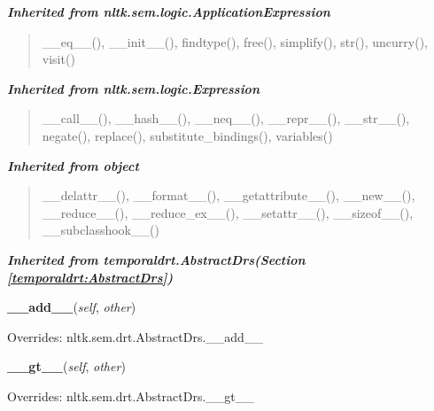 \large{\textbf{\textit{Inherited from nltk.sem.logic.ApplicationExpression}}}

\begin{quote}
\_\_eq\_\_(), \_\_init\_\_(), findtype(), free(), simplify(), str(), uncurry(), visit()
\end{quote}

\large{\textbf{\textit{Inherited from nltk.sem.logic.Expression}}}

\begin{quote}
\_\_call\_\_(), \_\_hash\_\_(), \_\_neq\_\_(), \_\_repr\_\_(), \_\_str\_\_(), negate(), replace(), substitute\_bindings(), variables()
\end{quote}

\large{\textbf{\textit{Inherited from object}}}

\begin{quote}
\_\_delattr\_\_(), \_\_format\_\_(), \_\_getattribute\_\_(), \_\_new\_\_(), \_\_reduce\_\_(), \_\_reduce\_ex\_\_(), \_\_setattr\_\_(), \_\_sizeof\_\_(), \_\_subclasshook\_\_()
\end{quote}

\large{\textbf{\textit{Inherited from temporaldrt.AbstractDrs\textit{(Section \ref{temporaldrt:AbstractDrs})}}}}

    \vspace{0.5ex}

\hspace{.8\funcindent}\begin{boxedminipage}{\funcwidth}

    \raggedright \textbf{\_\_add\_\_}(\textit{self}, \textit{other})

\setlength{\parskip}{2ex}
\setlength{\parskip}{1ex}
      Overrides: nltk.sem.drt.AbstractDrs.\_\_add\_\_

    \end{boxedminipage}

    \vspace{0.5ex}

\hspace{.8\funcindent}\begin{boxedminipage}{\funcwidth}

    \raggedright \textbf{\_\_gt\_\_}(\textit{self}, \textit{other})

\setlength{\parskip}{2ex}
\setlength{\parskip}{1ex}
      Overrides: nltk.sem.drt.AbstractDrs.\_\_gt\_\_

    \end{boxedminipage}

    \vspace{0.5ex}

